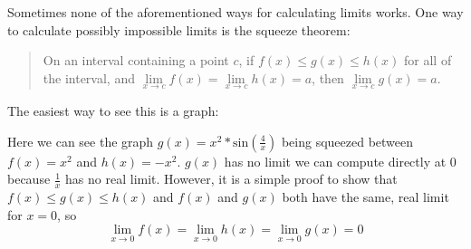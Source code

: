 \documentclass[../revisedMain.tex]{subfiles}
\begin{document}
	Sometimes none of the aforementioned ways for calculating limits works. One way to calculate possibly impossible limits is the squeeze theorem:
	\begin{quote}
		On an interval containing a point $c$, if $f(x)\leq g(x) \leq h(x)$ for all of the interval, and $\lim\limits_{x\to c} f(x) = \lim\limits_{x\to c} h(x) = a$, then $\lim\limits_{x\to c} g(x) = a$. 
	\end{quote}
	The easiest way to see this is a graph:
		\begin{center}
		\end{center}
		Here we can see the graph $g(x)=x^2*\text{sin}(\frac{4}{x})$ being squeezed between $f(x)=x^2$ and $h(x)=-x^2$. $g(x)$ has no limit we can compute directly at 0 because $\frac{1}{x}$ has no real limit. However, it is a simple proof to show that $f(x)\leq g(x) \leq h(x)$ and $f(x)$ and $g(x)$ both have the same, real limit for $x=0$, so $$\lim_{x\to 0} f(x) = \lim_{x\to 0} h(x) =\lim_{x\to 0} g(x)= 0$$
\end{document}
